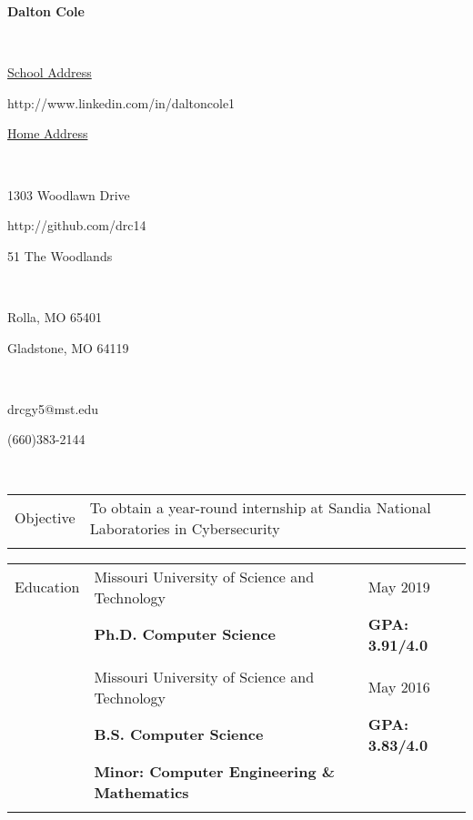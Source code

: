\documentclass[10.5pt, arial]{article}
\newcommand\textbox[1]{%
  \parbox{.333\textwidth}{#1}%
}
\begin{document}

\noindent\textbox{\hfill}\textbox{\hfil \textbf{Dalton Cole}\hfil}\textbox{\hfill} \\
\noindent\textbox{\underline{School Address}\hfill}\textbox{\hfil http://www.linkedin.com/in/daltoncole1\hfil}\textbox{\hfill \underline{Home Address}} \\
\noindent\textbox{1303 Woodlawn Drive\hfill}\textbox{\hfil http://github.com/drc14\hfil}\textbox{\hfill 51 The Woodlands} \\
\noindent\textbox{Rolla, MO 65401\hfill}\textbox{\hfil \hfil}\textbox{\hfill Gladstone, MO 64119} \\
\noindent\textbox{drcgy5@mst.edu\hfill}\textbox{\hfil \hfil}\textbox{\hfill (660)383-2144} \\
\noindent\makebox[\linewidth]{\rule{\textwidth}{.4pt}} 

\begin{tabular}{p{1.5cm} p{13.2cm} l}
Objective  	& To obtain a year-round internship at Sandia National Laboratories in Cybersecurity 	& 						\\ \\
\end{tabular}

\begin{tabular}{p{1.5cm} p{13.2cm} l}
Education  	& Missouri University of Science and Technology 					& May 2019 				\\
			& \textbf{Ph.D. Computer Science} 									& \textbf{GPA: 3.91/4.0}	\\ \\

		  	& Missouri University of Science and Technology 					& May 2016 				\\
			& \textbf{B.S. Computer Science} 									& \textbf{GPA: 3.83/4.0} \\
			& \textbf{Minor: Computer Engineering \& Mathematics} 										\\ \\
\end{tabular}
\end{document}

